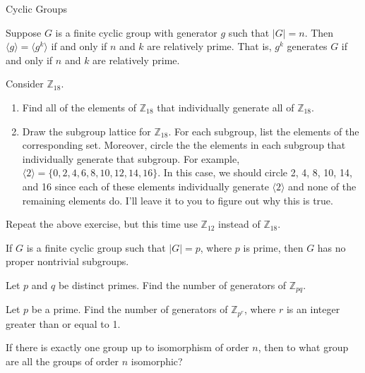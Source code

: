 \begin{section}{Cyclic Groups}
\begin{corollary}
Suppose $G$ is a finite cyclic group with generator $g$ such that $|G|=n$. Then $\langle g\rangle=\langle g^k\rangle$ if and only if $n$ and $k$ are relatively prime. That is, $g^k$ generates $G$ if and only if $n$ and $k$ are relatively prime.
\end{corollary}

\begin{problem}
Consider $\mathbb{Z}_{18}$.
\begin{enumerate}[label=\rm{(\alph*)}]
\item Find all of the elements of $\mathbb{Z}_{18}$ that individually generate all of $\mathbb{Z}_{18}$.
\item Draw the subgroup lattice for $\mathbb{Z}_{18}$. For each subgroup, list the elements of the corresponding set.  Moreover, circle the the elements in each subgroup that individually generate that subgroup.  For example, $\langle 2\rangle=\{0,2,4,6,8,10,12,14,16\}$. In this case, we should circle 2, 4, 8, 10, 14, and 16 since each of these elements individually generate $\langle 2\rangle$ and none of the remaining elements do.  I'll leave it to you to figure out why this is true.
\end{enumerate}
\end{problem}

\begin{problem}
Repeat the above exercise, but this time use $\mathbb{Z}_{12}$ instead of $\mathbb{Z}_{18}$.
\end{problem}

\begin{corollary}
If $G$ is a finite cyclic group such that $|G|=p$, where $p$ is prime, then $G$ has no proper nontrivial subgroups.
\end{corollary}

\begin{problem}
Let $p$ and $q$ be distinct primes. Find the number of generators of $\mathbb{Z}_{pq}$.
\end{problem}

\begin{problem}
Let $p$ be a prime. Find the number of generators of $\mathbb{Z}_{p^r}$, where $r$ is an integer greater than or equal to 1.
\end{problem}

\begin{problem}
If there is exactly one group up to isomorphism of order $n$, then to what group are all the groups of order $n$ isomorphic?
\end{problem}

\end{section}


